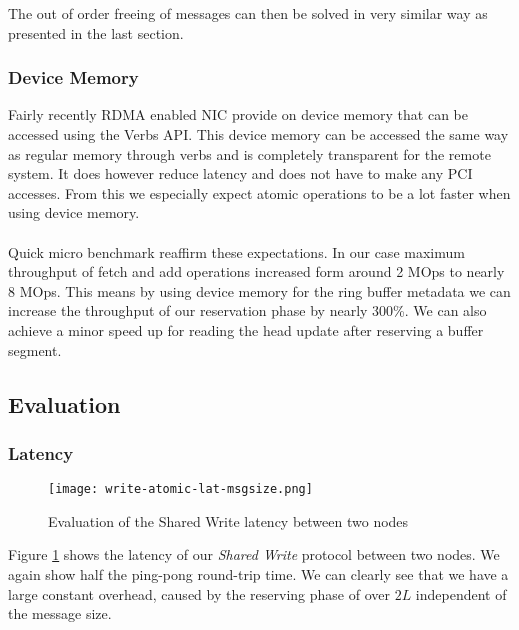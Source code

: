 The out of order freeing of messages can then be solved in very similar way as presented in the last section.


\subsubsection{Device Memory}
Fairly recently RDMA enabled NIC provide on device memory that can be accessed using the Verbs API. This device memory can 
be accessed the same way as regular memory through verbs and is completely transparent for the remote system. It does however
reduce latency and does not have to make any PCI accesses. From this we especially expect atomic operations to be a lot faster
when using device memory.

\paragraph{} Quick micro benchmark reaffirm these expectations. In our case maximum throughput of fetch and add operations 
increased form around 2 MOps to nearly 8 MOps. This means by using device memory for the ring buffer metadata we can increase
the throughput of our reservation phase by nearly 300\%. We can also achieve a minor speed up for reading the head update after
reserving a buffer segment.

\subsection{Evaluation}

\subsubsection{Latency}

\begin{figure}[h]
\texttt{[image: write-atomic-lat-msgsize.png]}
\caption{Evaluation of the Shared Write latency between two nodes}
\label{fig:plot-write-atomic-lat}
\end{figure}

Figure \ref{fig:plot-write-atomic-lat} shows the latency of our \emph{Shared Write} protocol between two nodes. 
We again show half the ping-pong round-trip time. We can clearly see that we have a large constant overhead, caused
by the reserving phase of over $2L$ independent of the message size.

